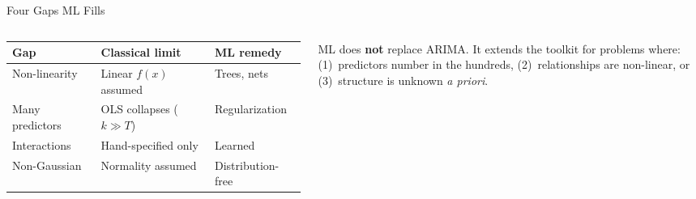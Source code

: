 \documentclass[aspectratio=169, 11pt]{beamer}
\begin{document}
\begin{frame}{Four Gaps ML Fills}
  \begin{columns}[T]
      {\footnotesize
      \begin{tabular}{p{2.0cm}p{2.6cm}p{2.0cm}}
        \toprule
        \textbf{Gap} & \textbf{Classical limit} & \textbf{ML remedy} \\
        \midrule
        Non-linearity  & Linear $f(x)$ assumed  & Trees, nets \\
        Many predictors & OLS collapses ($k \gg T$) & Regularization \\
        Interactions   & Hand-specified only     & Learned \\
        Non-Gaussian   & Normality assumed       & Distribution-free \\
        \bottomrule
      \end{tabular}
      }
      \begin{keybox}
        {\small ML does \textbf{not} replace ARIMA.
        It extends the toolkit for problems where:
        (1)~predictors number in the hundreds,
        (2)~relationships are non-linear, or
        (3)~structure is unknown \textit{a priori}.}
      \end{keybox}
  \end{columns}
\end{frame}
\end{document}
